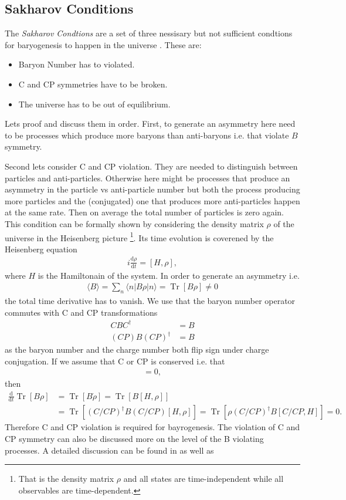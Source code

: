 \documentclass[13pt,a4paper,twoside,titlepage]{article}
\newcommand{\Tr}{\operatorname{Tr}}
\begin{document}
\subsection{Sakharov Conditions}
The \emph{Sakharov Condtions} are a set of three nessisary but not sufficient condtions for baryogenesis to happen in the universe \cite{Sakharov_1991}. These are:
\begin{itemize}
    \item Baryon Number has to violated.
    \item C and CP symmetries have to be broken.
    \item The universe has to be out of equilibrium.
\end{itemize}
Lets proof and discuss them in order.
First, to generate an asymmetry here need to be processes which produce more baryons than anti-baryons i.e. that violate $B$ symmetry.

Second lets consider C and CP violation. They are needed to distinguish between particles and anti-particles. Otherwise here might be processes that produce an asymmetry in the
particle vs anti-particle number but both the process producing more particles and the (conjugated) one that produces more anti-particles happen at the same rate.
Then on average the total number of particles is zero again.
This condition can be formally shown by considering the density matrix $\rho$ of the universe in the Heisenberg picture \footnote{That is the density matrix $\rho$ and all states are time-independent while all observables are time-dependent.}. Its time evolution is coverened by the Heisenberg equation
\begin{align}
    i \frac{\mathrm{d} \rho}{\mathrm{d} t} = [H, \rho],
\end{align}
where $H$ is the Hamiltonain of the system.
In order to generate an asymmetry i.e.
\begin{align}
    \langle B \rangle = \sum_n  \langle n | B \rho | n \rangle = \Tr [ B \rho ] \neq 0
\end{align}
the total time derivative has to vanish.
We use that the baryon number operator commutes with C and CP transformations
\begin{align}
    C B C^\dagger &= B \\
    (C P) B (C P)^\dagger &= B
\end{align}
as the baryon number and the charge number both flip sign under charge conjugation.
If we assume that C or CP is conserved i.e. that
\begin{align}
[H, C/CP] = 0,
\end{align}
then
\begin{align}
    \frac{\mathrm{d}}{\mathrm{d} t} \Tr [ B \rho ] &= \Tr [ B \dot{\rho} ] = \Tr [ B [H, \rho] ] \\
    &= \Tr [ (C/CP)^\dagger B (C/CP) [H, \rho] ] = \Tr [ \rho (C/CP)^\dagger B [C/CP, H] ] = 0.
\end{align}
Therefore C and CP violation is required for bayrogenesis. The violation of C and CP symmetry can also be discussed more on the level of the B violating processes. A detailed discussion can be found in \cite[sec 2.3]{Cline:2006ts_Baryogenesis} as well as %
\end{document}
